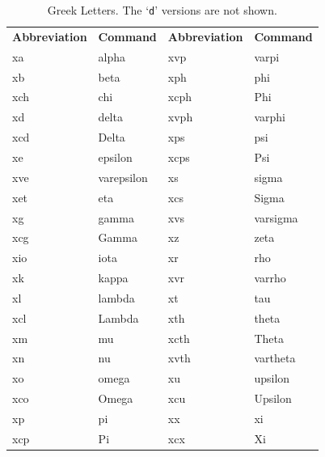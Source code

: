 \documentclass[letterpaper,11pt]{article}
\begin{document}
\begin{table}[H]
\small\centering
\begin{tabular}{llll}
\textbf{Abbreviation} & \textbf{Command} & \textbf{Abbreviation} & \textbf{Command} \\
\cmidrule[0.5pt](lr){1-1} \cmidrule[0.5pt](lr){2-2} \cmidrule[0.5pt](lr){3-3} \cmidrule[0.5pt](lr){4-4}
xa  & alpha      & xvp  & varpi \\
xb  & beta       & xph  & phi \\
xch & chi        & xcph & Phi \\
xd  & delta      & xvph & varphi \\
xcd & Delta      & xps  & psi \\
xe  & epsilon    & xcps & Psi \\
xve & varepsilon & xs   & sigma \\
xet & eta        & xcs  & Sigma \\
xg  & gamma      & xvs  & varsigma \\
xcg & Gamma      & xz   & zeta \\
xio & iota       & xr   & rho \\
xk  & kappa      & xvr  & varrho \\
xl  & lambda     & xt   & tau \\
xcl & Lambda     & xth  & theta \\
xm  & mu         & xcth & Theta \\
xn  & nu         & xvth & vartheta \\
xo  & omega      & xu   & upsilon \\
xco & Omega      & xcu  & Upsilon \\
xp  & pi         & xx   & xi \\
xcp & Pi         & xcx  & Xi \\
\end{tabular}
\caption{Greek Letters. The `\texttt{d}' versions are not shown.}
\label{tbl:greek}
\end{table}


\end{document}
